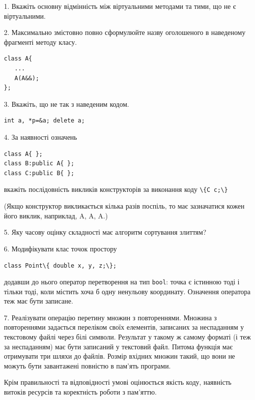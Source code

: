 \documentclass[12pt, ukrainian]{article}
\def\code#1{\Verb!#1!}
\begin{document}
{%
1. Вкажіть основну відмінність між віртуальними методами та тими, що не є віртуальними.%
\par
\vspace{2mm}
2. Максимально змістовно повно сформулюйте назву оголошеного в наведеному фрагменті методу класу.
\vspace{-3mm}
\begin{verbatim}class A{
   ...
   A(A&&);
};\end{verbatim}
\vspace{-3mm}
\par
\vspace{2mm}
3. Вкажіть, що не так з наведеним кодом.
\vspace{-3mm}
\begin{verbatim}int a, *p=&a; delete a;\end{verbatim}
\vspace{-3mm}
\par
\vspace{2mm}
4. За наявності означень
\vspace{-3mm}
\begin{verbatim}
class A{ };
class B:public A{ };
class C:public B{ };\end{verbatim}
\vspace{-3mm}
вкажіть послідовність викликів конструкторів за виконання коду \code{\{C c;\}} 

(Якщо конструктор викликається кілька разів поспіль, то має зазначатися кожен його виклик, наприклад, A, A, A.)

\vspace{2mm}
5. Яку часову оцінку складності має алгоритм сортування злиттям?
\par
\vspace{2mm}
6. Модифікувати клас точок простору 

\qquad\code{class Point\{ double x, y, z;\};}


додавши до нього оператор перетворення на тип \code{bool}: точка є істинною тоді і тільки тоді, коли містить хоча б одну ненульову координату. Означення оператора теж має бути записане.%
\par
\vspace{2mm}
7. 
Реалізувати операцію перетину множин з повтореннями. Множина з повтореннями задається переліком своїх елементів, записаних за неспаданням у текстовому файлі через білі символи. Результат у такому ж самому форматі (і теж за неспаданням) має бути записаний у текстовий файл. Питома функція має отримувати три шляхи до файлів. Розмір вхідних множин такий, що вони не можуть бути завантажені повністю в пам’ять програми.

Крім правильності та відповідності умові оцінюється якість коду, наявність витоків ресурсів та коректність роботи з пам'яттю. 

}
\end{document}
